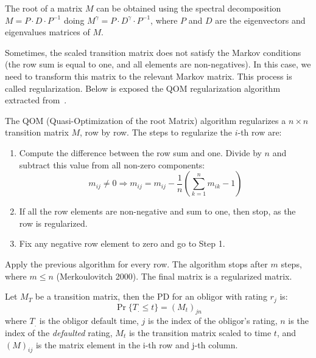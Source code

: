 \documentclass[11pt,fleqn]{book} %
\begin{document}
The root of a matrix $M$ can be obtained using the spectral decomposition
$M = P \cdot D \cdot P^{-1}$ doing 
$M^{\gamma} = P \cdot D^{\gamma} \cdot P^{-1}$, where $P$ and $D$ are the 
eigenvectors and eigenvalues matrices of $M$. 

Sometimes, the scaled transition matrix does not satisfy the Markov conditions
(the row sum is equal to one, and all elements are non-negatives). In this case, 
we need to transform this matrix to the relevant Markov matrix. This process is 
called regularization. Below is exposed the QOM regularization algorithm 
extracted from~\cite{kreinin:2001}.

\begin{algorithm}
	The QOM (Quasi-Optimization of the root Matrix) algorithm regularizes a 
	$n {\times} n$ transition matrix $M$, row by row. The steps to 
	regularize the $i$-th row are:
	\begin{enumerate}
		\item Compute the difference between the row sum and one. 
		Divide by $n$ and subtract this value from all non-zero components:
		\begin{displaymath}
			m_{ij} \ne 0 
			\Longrightarrow 
			m_{ij} = m_{ij} - \frac{1}{n} \left( \sum_{k=1}^{n} m_{ik} - 1\right)
		\end{displaymath}
		\item If all the row elements are non-negative and sum to one, 
		then stop, as the row is regularized.
		\item Fix any negative row element to zero and go to Step 1.
	\end{enumerate}
	
	Apply the previous algorithm for every row. The algorithm stops after $m$ 
	steps, where $m \le n$ (Merkoulovitch 2000). The final matrix is a regularized
	matrix. 
\end{algorithm}

\begin{proposition}
	\label{prop:pdftm}
	Let $M_T$ be a transition matrix, then the PD for an obligor with 
	rating $r_j$ is:
	\begin{displaymath}
		\Pr\{T_. \le t\} = \left( M_t \right)_{jn}
	\end{displaymath}
	where $T_.$ is the obligor default time, $j$ is the index of the obligor's
	rating, $n$ is the index of the \emph{defaulted} rating, $M_t$ is the 
	transition matrix scaled to time $t$, and $(M)_{ij}$ is the matrix element
	in the i-th row and j-th column.
\end{proposition}
\end{document}
